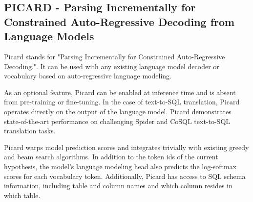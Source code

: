 \subsection{PICARD - Parsing Incrementally for Constrained Auto-Regressive Decoding from Language Models}

Picard\cite{scholak_picard_2021} stands for "Parsing Incrementally for Constrained Auto-Regressive Decoding.". It can be used with any existing language model decoder or vocabulary based on auto-regressive language modeling.

As an optional feature, Picard can be enabled at inference time and is absent from pre-training or fine-tuning. In the case of text-to-SQL translation, Picard operates directly on the output of the language model.
Picard demonstrates state-of-the-art performance on challenging Spider and CoSQL text-to-SQL translation tasks.

Picard warps model prediction scores and integrates trivially with existing greedy and beam search algorithms. In addition to the token ids of the current hypothesis, the model's language modeling head also predicts the log-softmax scores for each vocabulary token. Additionally, Picard has access to SQL schema information, including table and column names and which column resides in which table.